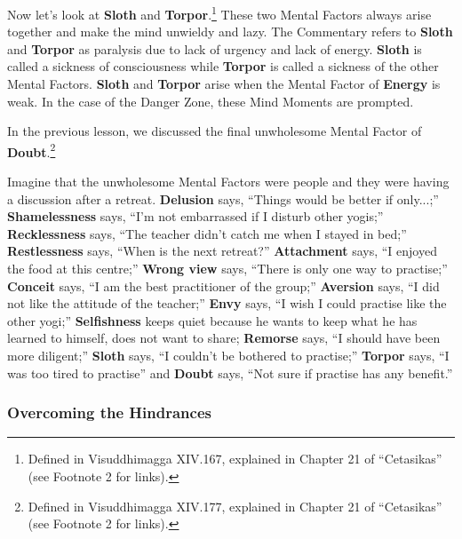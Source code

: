 Now let’s look at \textbf{Sloth} and \textbf{Torpor}.\footnote{Defined in Visuddhimagga XIV.167, explained in Chapter 21 of “Cetasikas” (see Footnote 2 for links).} These two Mental Factors always arise together and make the mind unwieldy and lazy. The Commentary refers to \textbf{Sloth} and \textbf{Torpor} as paralysis due to lack of urgency and lack of energy. \textbf{Sloth} is called a sickness of consciousness while \textbf{Torpor} is called a sickness of the other Mental Factors. \textbf{Sloth} and \textbf{Torpor} arise when the Mental Factor of \textbf{Energy} is weak. In the case of the Danger Zone, these Mind Moments are prompted.

In the previous lesson, we discussed the final unwholesome Mental Factor of \textbf{Doubt}.\footnote{Defined in Visuddhimagga XIV.177, explained in Chapter 21 of “Cetasikas” (see Footnote 2 for links).}
\pagebreak

Imagine that the unwholesome Mental Factors were people and they were having a discussion after a retreat. \textbf{Delusion} says, “Things would be better if only...;” \textbf{Shamelessness} says, “I’m not embarrassed if I disturb other yogis;” \textbf{Recklessness} says, “The teacher didn’t catch me when I stayed in bed;” \textbf{Restlessness} says, “When is the next retreat?” \textbf{Attachment} says, “I enjoyed the food at this centre;” \textbf{Wrong view} says, “There is only one way to practise;” \textbf{Conceit} says, “I am the best practitioner of the group;” \textbf{Aversion} says, “I did not like the attitude of the teacher;” \textbf{Envy} says, “I wish I could practise like the other yogi;” \textbf{Selfishness} keeps quiet because he wants to keep what he has learned to himself, does not want to share; \textbf{Remorse} says, “I should have been more diligent;” \textbf{Sloth} says, “I couldn’t be bothered to practise;” \textbf{Torpor} says, “I was too tired to practise” and \textbf{Doubt} says, “Not sure if practise has any benefit.”

\subsubsection*{Overcoming the Hindrances}

